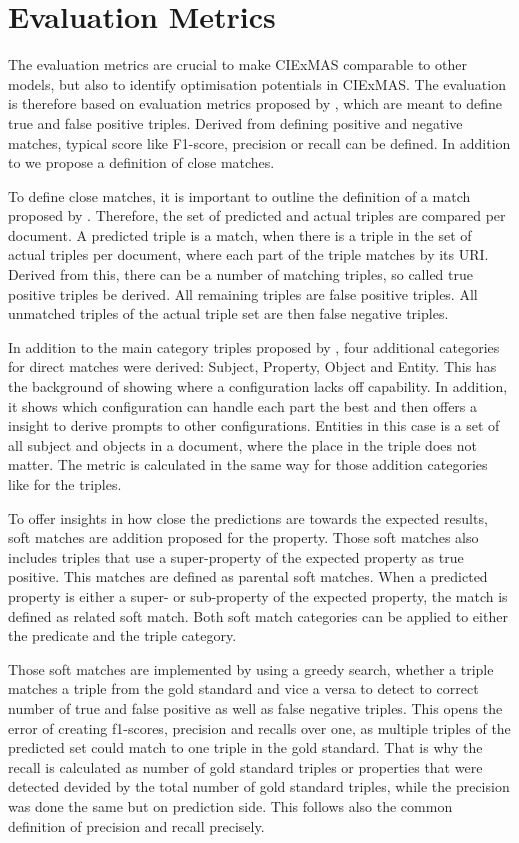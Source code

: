 \documentclass[a4paper,oneside,bibliography=totoc]{scrbook}
\begin{document}
\section{Evaluation Metrics}
\label{sec:evaluation_metrics}
The evaluation metrics are crucial to make CIExMAS comparable to other models, but also to identify optimisation potentials in CIExMAS. The evaluation is therefore based on evaluation metrics proposed by \citet{Josifoski2021}, which are meant to define true and false positive triples. Derived from defining positive and negative matches, typical score like F1-score, precision or recall can be defined. In addition to \citet{Josifoski2021} we propose a definition of close matches.

To define close matches, it is important to outline the definition of a match proposed by \citet{Josifoski2021}. Therefore, the set of predicted and actual triples are compared per document. A predicted triple is a match, when there is a triple in the set of actual triples per document, where each part of the triple matches by its \ac{URI}. Derived from this, there can be a number of matching triples, so called true positive triples be derived. All remaining triples are false positive triples. All unmatched triples of the actual triple set are then false negative triples.

In addition to the main category triples proposed by \citet{Josifoski2021}, four additional categories for direct matches were derived: Subject, Property, Object and Entity. This has the background of showing where a configuration lacks off capability. In addition, it shows which configuration can handle each part the best and then offers a insight to derive prompts to other configurations. Entities in this case is a set of all subject and objects in a document, where the place in the triple does not matter. The metric is calculated in the same way for those addition categories like for the triples.

To offer insights in how close the predictions are towards the expected results, soft matches are addition proposed for the property. Those soft matches also includes triples that use a super-property of the expected property as true positive. This matches are defined as parental soft matches. When a predicted property is either a super- or sub-property of the expected property, the match is defined as related soft match. Both soft match categories can be applied to either the predicate and the triple category.

Those soft matches are implemented by using a greedy search, whether a triple matches a triple from the gold standard and vice a versa to detect to correct number of true and false positive as well as false negative triples. This opens the error of creating f1-scores, precision and recalls over one, as multiple triples of the predicted set could match to one triple in the gold standard. That is why the recall is calculated as number of gold standard triples or properties that were detected devided by the total number of gold standard triples, while the precision was done the same but on prediction side. This follows also the common definition of precision and recall precisely.
\end{document}
